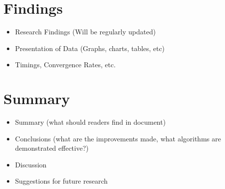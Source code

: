 \documentclass[11pt]{fsuthesis}
\begin{document}
\chapter{Findings}
\begin{itemize} 
	\item Research Findings (Will be regularly updated)
	\item Presentation of Data (Graphs, charts, tables, etc)
	\item Timings, Convergence Rates, etc.
\end{itemize} 

\chapter{Summary}
\begin{itemize} 
\item Summary (what should readers find in document)
\item Conclusions (what are the improvements made, what algorithms are demonstrated effective?)
\item Discussion
\item Suggestions for future research
\end{itemize} 
% 
%
%
%
% 


%


%
%

%
\end{document}
